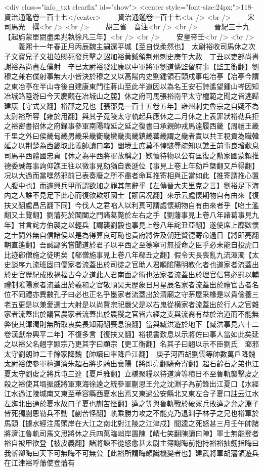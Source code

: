<div class="info_txt clearfix" id="show">
<center style="font-size:24px;">118-資治通鑑卷一百十七</center>
  　　資治通鑑卷一百十七<br />
<br />
　　宋　司馬光　撰<br />
<br />
　　胡三省　音注<br />
<br />
　　晉紀三十九【起旃蒙單閼盡柔兆執徐凡三年】<br />
<br />
　　安皇帝壬<br />
<br />
　　義熙十一年春正月丙辰魏主嗣還平城【至自伐柔然也】　太尉裕收司馬休之次子文寶兄子文祖竝賜死發兵擊之詔加裕黄鉞領荆州刺史庚午大赦　丁丑以吏部尚書謝裕為尚書左僕射　辛巳太尉裕發建康以中軍將軍劉道憐監留府事【監工銜翻】劉穆之兼右僕射事無大小皆決於穆之又以高陽内史劉鍾領石頭戍事屯冶亭【冶亭今謂之東冶亭在半山寺後自建康東門往蔣山至此半道因以為名王安石詩遙望鍾山岑因知冶城路陸游曰今天慶觀在冶城山之麓】休之府司馬張裕南平太守檀範之聞之皆逃歸建康【守式又翻】裕邵之兄也【張邵見一百十五卷五年】雍州刺史魯宗之自疑不為太尉裕所容【雍於用翻】與其子竟陵太守軌起兵應休之二月休之上表罪狀裕勒兵拒之裕密書招休之府録事參軍南陽韓延之延之復書曰承親帥戎馬遠履西畿【周禮王畿千里之外曰侯畿甸畿男畿采畿衛畿蠻畿夷畿鎮畿蕃畿謂之畿者責以共王稅貢為職韓延之以荆楚為西畿取此義帥讀曰率】闔境士庶莫不惶駭辱疏知以譙王前事良增歎息司馬平西體國忠貞【休之為平西將軍故稱之】欵懷待物以公有匡復之勲家國蒙賴推德委誠每事詢仰譙王往以微事見劾猶自表遜位【事見上卷上年劾戶槩翻又戶得翻】况以大過而當嘿然邪前已表奏廢之所不盡者命耳推寄相與正當如此【推寄謂推心置人腹中也】而遽興兵甲所謂欲加之罪其無辭乎【左傳晉大夫里克之言】劉裕足下海内之人誰不見足下此心而復欲欺誑國士【誑居况翻】來示云處懷期物自有由來【復扶又翻處昌呂翻下同】今伐人之君啗人以利真可謂處懷期物自有由來者乎【啗土濫翻又土覽翻】劉藩死於閶闔之門諸葛斃於左右之手【劉藩事見上卷八年諸葛事見九年】甘言詫方伯襲之以輕兵【謂襲劉毅也事見上卷八年詫丑亞翻】遂使席上靡欵懷之士閫外無自信諸侯以是為得算良可恥也貴府將佐及朝廷賢德寄命過日【將即亮翻朝直遙翻】吾誠鄙劣嘗聞道於君子以平西之至德寧可無授命之臣乎必未能自投虎口比迹郗僧施之徒明矣【郗僧施事見上卷八年郗丑之翻】假令天長喪亂九流渾濁【太史談序九流班固曰儒家者流蓋出於司徒之官助人君順隂陽明教化者也道家者流蓋出於史官歷紀成敗禍福古今之道此人君南面之術也法家者流蓋出於理官信賞必罰以輔禮制隂陽家者流蓋出於羲和之官敬順昊天歷象日月星辰名家者流蓋出於禮官古者名位不同禮亦異數孔子曰必也正名乎墨家者流蓋出於清廟之守茅屋采椽是以貴儉養三老五更是以兼愛選士大射是以尚賢宗祀嚴父是以右鬼從横家者流蓋出於行人之官雜家者流蓋出於議官農家者流蓋出於農稷之官皆六經之支與流裔有益於治道而不能無弊使其渾濁則無所取衷矣長知兩翻喪息浪翻】當與臧洪遊於地下【臧洪事見六十二卷漢獻帝興平二年】不復多言【復扶又翻】裕視書歎息以示將佐曰事人當如此矣延之以裕父名翹字顯宗乃更其字曰顯宗【更工衡翻】名其子曰翹以示不臣劉氏　瑯邪太守劉朗帥二千餘家降魏【帥讀曰率降戶江翻】　庚子河西胡劉雲等帥數萬戶降魏　太尉裕使參軍檀道濟朱超石將步騎出襄陽【將即亮翻騎奇寄翻】超石齡石之弟也江夏太守劉䖍之將兵屯三連【夏戶雅翻】立橋聚糧以待道濟等積日不至魯軌襲擊䖍之殺之裕使其壻振威將軍東海徐逵之統參軍蒯恩王允之沈淵子為前鋒出江夏口【水經江水過江陵城南又東至華容縣西夏水出焉又東過公安縣北又東左合子夏口註云江水左迤北出通於夏水故曰子夏也蒯苦怪翻】逵之等與魯軌戰於破冢兵敗逵之允之淵子皆死獨蒯恩勒兵不動【蒯苦怪翻】軌乘勝力攻之不能克乃退淵子林子之兄也裕軍於馬頭【據水經注馬頭岸在大江之南北對江陵之江津戍】聞逵之死怒甚三月壬午帥諸將濟江魯軌司馬文思將休之兵四萬臨峭岸置陳【峭七笑翻陳讀曰陣】軍士無能登者裕自被甲欲登【被皮義翻】諸將諫不從怒愈甚太尉主簿謝晦前抱持裕裕抽劒指晦曰我斬卿晦曰天下可無晦不可無公【此裕所謂晦頗識機變者也】建武將軍胡藩領遊兵在江津裕呼藩使登藩有